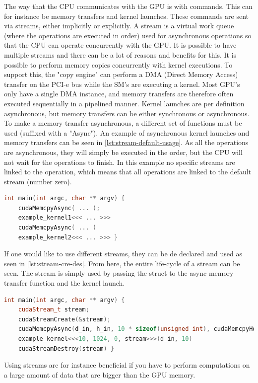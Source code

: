 The way that the CPU communicates with the GPU is with commands.
This can for instance be memory transfers and kernel launches.
These commands are sent via streams, either implicitly or explicitly.
A stream is a virtual work queue (where the operations are executed in order) used for asynchronous operations so that the CPU can operate concurrently with the GPU.
It is possible to have multiple streams and there can be a lot of reasons and benefits for this.
It is possible to perform memory copies concurrently with kernel executions.
To support this, the "copy engine" can perform a DMA (Direct Memory Access) transfer on the PCI-e bus while the SM's are executing a kernel.
Most GPU's only have a single DMA instance, and memory transfers are therefore often executed sequentially in a pipelined manner.
Kernel launches are per definition asynchronous, but memory transfers can be either synchronous or asynchronous.
To make a memory transfer asynchronous, a different set of \cuda{} functions must be used (suffixed with a "Async").
An example of asynchronous kernel launches and memory transfers can be seen in \autoref{lst:stream-default-usage}.
As all the operations are asynchronous, they will simply be executed in the order, but the CPU will not wait for the operations to finish.
In this example no specific streams are linked to the operation, which means that all operations are linked to the default stream (number zero).
\begin{lstlisting}[language=C++,caption={Default stream usage},label=lst:stream-default-usage]
int main(int argc, char ** argv) {
	cudaMemcpyAsync( ... );
	example_kernel1<<< ... >>>
	cudaMemcpyAsync( ... )
	example_kernel2<<< ... >>> }
\end{lstlisting}
If one would like to use different streams, they can be de declared and used as seen in \autoref{lst:stream-cre-des}.
From here, the entire life-cycle of a \cuda{} stream can be seen.
The stream is simply used by passing the \cuda{} struct to the async memory transfer function and the kernel launch.
\begin{lstlisting}[language=C++,caption={Stream creation, usage and destruction},label=lst:stream-cre-des]
int main(int argc, char ** argv) {
	cudaStream_t stream;
	cudaStreamCreate(&stream);
	cudaMemcpyAsync(d_in, h_in, 10 * sizeof(unsigned int), cudaMemcpyHostToDevice, stream);
	example_kernel<<<10, 1024, 0, stream>>>(d_in, 10)
	cudaStreamDestroy(stream) }
\end{lstlisting}
Using streams are for instance beneficial if you have to perform computations on a large amount of data that are bigger than the GPU memory.
